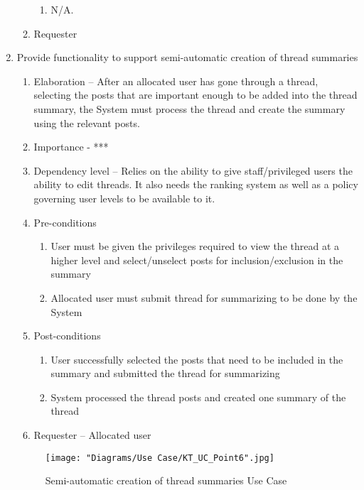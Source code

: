 \documentclass[12pt]{article}
\begin{document}
\begin{enumerate}
\begin{enumerate}
\begin{enumerate}
    	\item N/A.
    \end{enumerate}
    \item Requester
  \end{enumerate}
\newpage %
   \item  Provide functionality to support semi-automatic creation of thread summaries%
  \begin{enumerate}
    \item Elaboration – After an allocated user has gone through a thread, selecting the posts that are important enough to be added into the thread summary, the System must process the thread and create the summary using the relevant posts. 
    \item Importance - ***
    \item Dependency level – Relies on the ability to give staff/privileged users the ability to edit threads. It also needs the ranking system as well as a policy governing user levels to be available to it.
    \item Pre-conditions
    \begin{enumerate}
    	\item User must be given the privileges required to view the thread at a higher level and select/unselect posts for inclusion/exclusion in the summary
    	\item Allocated user must submit thread for summarizing to be done by the System
    \end{enumerate}
        \item Post-conditions
    \begin{enumerate}
    	\item User successfully selected the posts that need to be included in the summary and submitted the thread for summarizing
    	\item System processed the thread posts and created one summary of the thread
    \end{enumerate}
    \item Requester – Allocated user
  \end{enumerate}
\begin{figure}[h]
	\centering
	\texttt{[image: "Diagrams/Use Case/KT\_UC\_Point6".jpg]}
	\caption{Semi-automatic creation of thread summaries Use Case}
\end{figure}
\begin{figure}[h]

\end{figure}
\end{enumerate}
\end{document}
